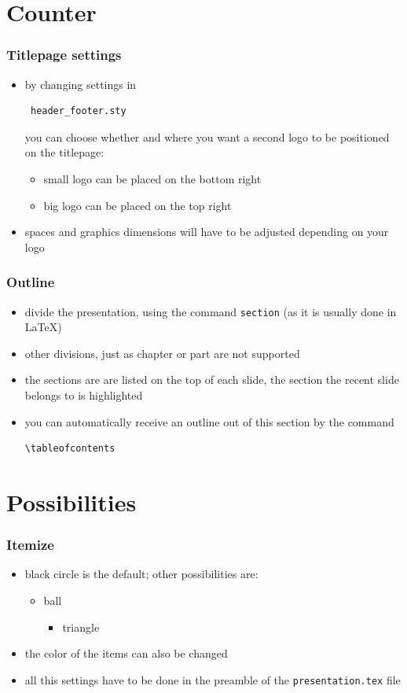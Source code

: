 \documentclass{beamer}
\begin{document}
\begin{frame}[fragile]
\section{Counter}

\begin{frame}[fragile]
\frametitle{Titlepage settings}
\begin{itemize}
\item by changing settings in \begin{verbatim} header_footer.sty \end{verbatim} you can choose whether and where you want a second logo to be positioned on the titlepage:
\begin{itemize}
\item small logo can be placed on the bottom right
\item big logo can be placed on the top right
\end{itemize}
\item spaces and graphics dimensions will have to be adjusted depending on your logo
\end{itemize}
\end{frame}

\begin{frame}[fragile]
\frametitle{Outline}
\begin{itemize}
\item divide the presentation, using the command {\tt section}
(as it is usually done in \LaTeX)
\item other divisions, just as chapter or part are not supported
\item the sections are are listed on the top of each slide, the section the
recent slide belongs to is highlighted
\item you can automatically receive an outline out of this section by the command
\begin{verbatim}
\tableofcontents
\end{verbatim}
\end{itemize}
\end{frame}


\section{Possibilities}

\begin{frame}
\frametitle{Itemize}
\begin{itemize}
\item black circle is the default; other possibilities are:
\begin{itemize}
\item ball
\begin{itemize}
\item triangle
\end{itemize}
\end{itemize}
\item the color of the items can also be changed
\item all this settings have to be done in the preamble of the {\tt presentation.tex} file
\end{itemize}
\end{frame}


\end{frame}
\end{document}
